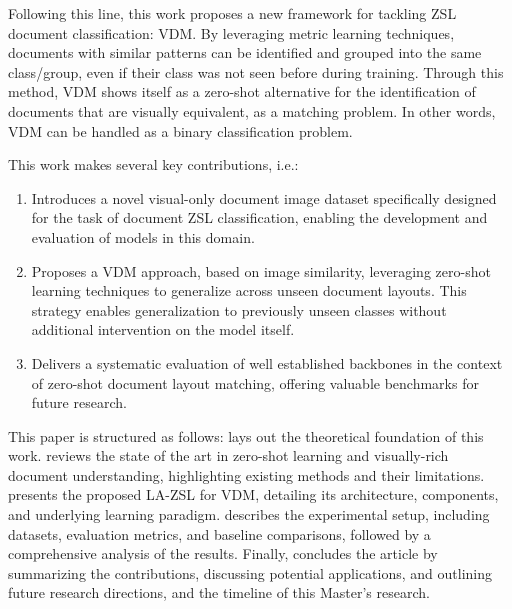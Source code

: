 Following this line, this work proposes a new framework for tackling \gls{ZSL} document classification: \gls{VDM}. By leveraging metric learning techniques, documents with similar patterns can be identified and grouped into the same class/group, even if their class was not seen before during training. Through this method, \gls{VDM} shows itself as a zero-shot alternative for the identification of documents that are visually equivalent, as a matching problem. In other words, \gls{VDM} can be handled as a binary classification problem.

This work makes several key contributions, i.e.:
\begin{enumerate}
    \item Introduces a novel visual-only document image dataset specifically designed for the task of document ZSL classification, enabling the development and evaluation of models in this domain.
    \item Proposes a \gls{VDM} approach, based on image similarity, leveraging zero-shot learning techniques to generalize across unseen document layouts. This strategy enables generalization to previously unseen classes without additional intervention on the model itself.
    \item Delivers a systematic evaluation of well established backbones in the context of zero-shot document layout matching, offering valuable benchmarks for future research.
\end{enumerate}

This paper is structured as follows:  lays out the theoretical foundation of this work.  reviews the state of the art in zero-shot learning and visually-rich document understanding, highlighting existing methods and their limitations.  presents the proposed \gls{LA-ZSL} for \gls{VDM}, detailing its architecture, components, and underlying learning paradigm.  describes the experimental setup, including datasets, evaluation metrics, and baseline comparisons, followed by a comprehensive analysis of the results. Finally,  concludes the article by summarizing the contributions, discussing potential applications, and outlining future research directions, and the timeline of this Master's research.

